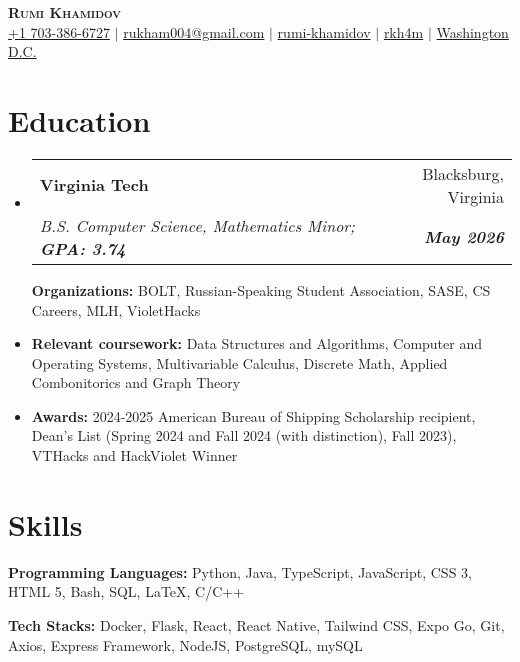 \documentclass[letterpaper, 10pt]{article}
\makeatletter
\newcommand{\resumeItem}[1]{
  \item\small{
    {#1 \vspace{-2pt}}
  }
}
\newcommand{\resumeEducationHeading}[6]{
  \vspace{-2pt}\item
    \begin{tabular*}{0.97\textwidth}[t]{l@{\extracolsep{\fill}}r}
      \textbf{#1} & #2 \\
      \textit{\small#3} & \textit{\small #4} \\
    \end{tabular*}\vspace{-5pt}
}
\newcommand{\resumeSubHeadingListStart}{\begin{itemize}[leftmargin=0.15in, label={}]}
\newcommand{\resumeSubHeadingListEnd}{\end{itemize}}
\newcommand{\resumeItemListStart}{\begin{itemize}}
\newcommand{\resumeItemListEnd}{\end{itemize}\vspace{-5pt}}
\makeatother
\begin{document}

\begin{center}
    \textbf{\Huge \scshape Rumi Khamidov} \\ \vspace{3pt}
    \small
    \faMobile \hspace{.5pt} \href{tel:7033866727}{+1 703-386-6727}
    $|$
    \faAt \hspace{.5pt} \href{mailto:rumikham04@gmail.com}{rukham004@gmail.com}
    $|$
    \faLinkedinSquare \hspace{.5pt} \href{https://www.linkedin.com/in/rumi-khamidov}{rumi-khamidov}
    $|$
    \faGithub \hspace{.5pt} \href{https://github.com/rkh4m}{rkh4m}
    $|$
    \faMapMarker \hspace{.5pt} \href{https://maps.app.goo.gl/aoi52DAKhQkgQ1MT8}{Washington D.C.}
\end{center}



\section{Education}
  \vspace{3pt}
  \resumeSubHeadingListStart
    
    \resumeEducationHeading
      {Virginia Tech
      }{Blacksburg, Virginia}
      {B.S. Computer Science, Mathematics Minor; \textbf{GPA: 3.74}}{\textbf{May 2026}}

        \resumeItemListStart
	   \resumeItem{\textbf{Organizations:} BOLT, Russian-Speaking Student Association, SASE, CS Careers, MLH, VioletHacks}
             \resumeItem{\textbf{Relevant coursework:}  Data Structures and Algorithms, Computer and Operating Systems, Multivariable Calculus, Discrete Math, Applied Combonitorics and Graph Theory}
	\resumeItem{\textbf{Awards:}  2024-2025 American Bureau of Shipping Scholarship recipient, Dean's List (Spring 2024 and Fall 2024 (with distinction), Fall 2023), VTHacks and HackViolet Winner}
         \resumeItemListEnd


\section{Skills}
  \vspace{2pt}
  \resumeSubHeadingListStart
    \small{\item{
        \textbf{Programming Languages:}{ Python, Java, TypeScript, JavaScript, CSS 3, HTML 5, Bash, SQL, LaTeX, C/C++ } \\ \vspace{3pt}
                
        \textbf{Tech Stacks:}{ Docker, Flask, React, React Native, Tailwind CSS, Expo Go, Git, Axios, Express Framework, NodeJS, PostgreSQL, mySQL } \\ \vspace{3pt}
    }}
  \resumeSubHeadingListEnd
\end{document}
